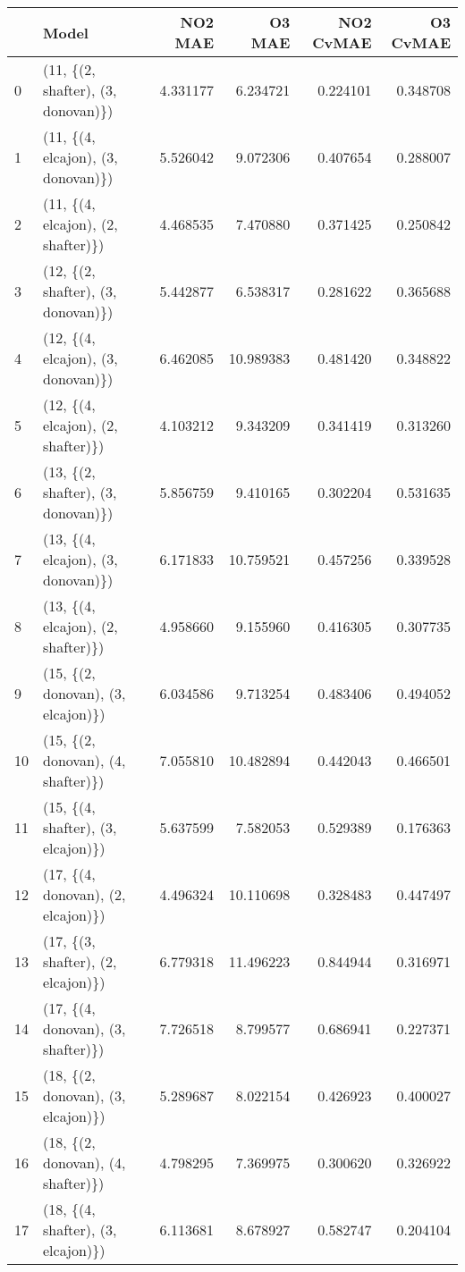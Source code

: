 \begin{tabular}{llrrrr}
\toprule
{} &                               Model &   NO2 MAE &     O3 MAE &  NO2 CvMAE &  O3 CvMAE \\
\midrule
0  &  (11, \{(2, shafter), (3, donovan)\}) &  4.331177 &   6.234721 &   0.224101 &  0.348708 \\
1  &  (11, \{(4, elcajon), (3, donovan)\}) &  5.526042 &   9.072306 &   0.407654 &  0.288007 \\
2  &  (11, \{(4, elcajon), (2, shafter)\}) &  4.468535 &   7.470880 &   0.371425 &  0.250842 \\
3  &  (12, \{(2, shafter), (3, donovan)\}) &  5.442877 &   6.538317 &   0.281622 &  0.365688 \\
4  &  (12, \{(4, elcajon), (3, donovan)\}) &  6.462085 &  10.989383 &   0.481420 &  0.348822 \\
5  &  (12, \{(4, elcajon), (2, shafter)\}) &  4.103212 &   9.343209 &   0.341419 &  0.313260 \\
6  &  (13, \{(2, shafter), (3, donovan)\}) &  5.856759 &   9.410165 &   0.302204 &  0.531635 \\
7  &  (13, \{(4, elcajon), (3, donovan)\}) &  6.171833 &  10.759521 &   0.457256 &  0.339528 \\
8  &  (13, \{(4, elcajon), (2, shafter)\}) &  4.958660 &   9.155960 &   0.416305 &  0.307735 \\
9  &  (15, \{(2, donovan), (3, elcajon)\}) &  6.034586 &   9.713254 &   0.483406 &  0.494052 \\
10 &  (15, \{(2, donovan), (4, shafter)\}) &  7.055810 &  10.482894 &   0.442043 &  0.466501 \\
11 &  (15, \{(4, shafter), (3, elcajon)\}) &  5.637599 &   7.582053 &   0.529389 &  0.176363 \\
12 &  (17, \{(4, donovan), (2, elcajon)\}) &  4.496324 &  10.110698 &   0.328483 &  0.447497 \\
13 &  (17, \{(3, shafter), (2, elcajon)\}) &  6.779318 &  11.496223 &   0.844944 &  0.316971 \\
14 &  (17, \{(4, donovan), (3, shafter)\}) &  7.726518 &   8.799577 &   0.686941 &  0.227371 \\
15 &  (18, \{(2, donovan), (3, elcajon)\}) &  5.289687 &   8.022154 &   0.426923 &  0.400027 \\
16 &  (18, \{(2, donovan), (4, shafter)\}) &  4.798295 &   7.369975 &   0.300620 &  0.326922 \\
17 &  (18, \{(4, shafter), (3, elcajon)\}) &  6.113681 &   8.678927 &   0.582747 &  0.204104 \\

\end{tabular}
